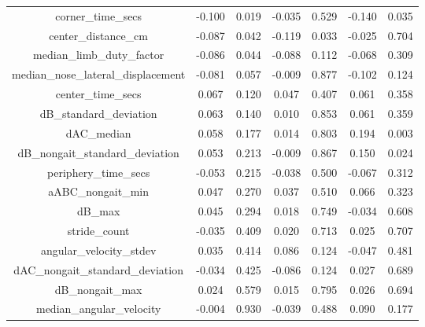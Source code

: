 \documentclass[11pt,reqno]{amsart}
\begin{document}
\begin{longtable}[c]{|c|c|c|c|c|c|c|}
corner\_time\_secs                        & -0.100   & 0.019   & -0.035 & 0.529   & -0.140  & 0.035   \\
center\_distance\_cm                      & -0.087   & 0.042   & -0.119 & 0.033   & -0.025  & 0.704   \\
median\_limb\_duty\_factor                & -0.086   & 0.044   & -0.088 & 0.112   & -0.068  & 0.309   \\
median\_nose\_lateral\_displacement       & -0.081   & 0.057   & -0.009 & 0.877   & -0.102  & 0.124   \\
center\_time\_secs                        & 0.067    & 0.120   & 0.047  & 0.407   & 0.061   & 0.358   \\
dB\_standard\_deviation                   & 0.063    & 0.140   & 0.010  & 0.853   & 0.061   & 0.359   \\
dAC\_median                               & 0.058    & 0.177   & 0.014  & 0.803   & 0.194   & 0.003   \\
dB\_nongait\_standard\_deviation          & 0.053    & 0.213   & -0.009 & 0.867   & 0.150   & 0.024   \\
periphery\_time\_secs                     & -0.053   & 0.215   & -0.038 & 0.500   & -0.067  & 0.312   \\
aABC\_nongait\_min                        & 0.047    & 0.270   & 0.037  & 0.510   & 0.066   & 0.323   \\
dB\_max                                   & 0.045    & 0.294   & 0.018  & 0.749   & -0.034  & 0.608   \\
stride\_count                             & -0.035   & 0.409   & 0.020  & 0.713   & 0.025   & 0.707   \\
angular\_velocity\_stdev                  & 0.035    & 0.414   & 0.086  & 0.124   & -0.047  & 0.481   \\
dAC\_nongait\_standard\_deviation         & -0.034   & 0.425   & -0.086 & 0.124   & 0.027   & 0.689   \\
dB\_nongait\_max                          & 0.024    & 0.579   & 0.015  & 0.795   & 0.026   & 0.694   \\
median\_angular\_velocity                 & -0.004   & 0.930   & -0.039 & 0.488   & 0.090   & 0.177 \\

 \end{longtable}
\end{document}

